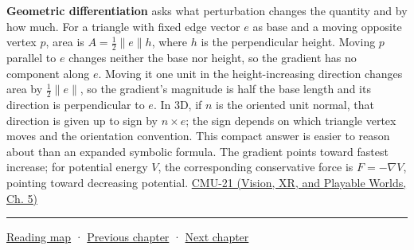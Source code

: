\textbf{Geometric differentiation} asks what perturbation changes the quantity and by how much. For a triangle with fixed edge vector \(e\) as base and a moving opposite vertex \(p\), area is \(A=\tfrac12\|e\|h\), where \(h\) is the perpendicular height. Moving \(p\) parallel to \(e\) changes neither the base nor height, so the gradient has no component along \(e\). Moving it one unit in the height-increasing direction changes area by \(\tfrac12\|e\|\), so the gradient's magnitude is half the base length and its direction is perpendicular to \(e\). In 3D, if \(n\) is the oriented unit normal, that direction is given up to sign by \(n\times e\); the sign depends on which triangle vertex moves and the orientation convention. This compact answer is easier to reason about than an expanded symbolic formula. The gradient points toward fastest increase; for potential energy \(V\), the corresponding conservative force is \(F=-\nabla V\), pointing toward decreasing potential. \href{../07-Vision-XR-and-Playable-Worlds/main.pdf\#nameddest=04-visual-computing-ii-ch036-cmu-21---dynamics-and-time-integration}{CMU-21 (Vision, XR, and Playable Worlds, Ch. 5)}

\begin{center}\rule{0.5\linewidth}{0.5pt}\end{center}

\hyperref[volume-reading-map]{Reading map} · \hyperref[04-visual-computing-ii-ch028-visibility-queries-and-ray-intersections]{Previous chapter} · \hyperref[04-visual-computing-ii-ch030-mesh-operators-boundaries-and-diffusion]{Next chapter}

